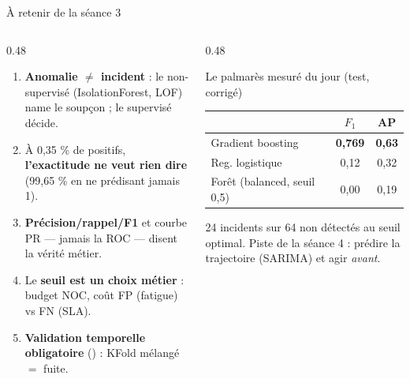 \begin{frame}{À retenir de la séance 3}
\footnotesize%
\begin{columns}[t]
\begin{column}{0.48\textwidth}
\begin{kbox}
\begin{enumerate}
\item \textbf{Anomalie $\ne$ incident} : le non-supervisé
(IsolationForest, LOF) name le soupçon ; le supervisé décide.
\item À 0,35 \% de positifs, \textbf{l'exactitude ne veut
rien dire} (99,65 \% en ne prédisant jamais 1).
\item \textbf{Précision/rappel/F1} et courbe PR --- jamais la
ROC --- disent la vérité métier.
\item Le \textbf{seuil est un choix métier} : budget NOC,
coût FP (fatigue) vs FN (SLA).
\item \textbf{Validation temporelle obligatoire}
() : KFold mélangé $=$ fuite.
\end{enumerate}
\end{kbox}
\end{column}
\begin{column}{0.48\textwidth}
\begin{block}{Le palmarès mesuré du jour (test, corrigé)}
\begin{center}\small
\begin{tabular}{@{}l c c@{}}
\toprule
 & $F_1$ & AP\\
\midrule
Gradient boosting & \textbf{0,769} & \textbf{0,63}\\
Reg. logistique & 0,12 & 0,32\\
Forêt (balanced, seuil 0,5) & 0,00 & 0,19\\
\bottomrule
\end{tabular}
\end{center}
\end{block}
\begin{wbox}
24 incidents sur 64 non détectés au seuil optimal. Piste de la
séance 4 : prédire la trajectoire (SARIMA) et agir \emph{avant}.
\end{wbox}
\end{column}
\end{columns}
\end{frame}


